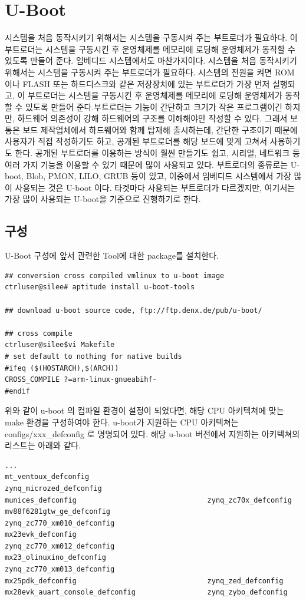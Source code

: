 \documentclass[11pt
  , a4paper
  , article
  , oneside
]{memoir}
\begin{document}
\chapter{U-Boot}
시스템을 처음 동작시키기 위해서는 시스템을 구동시켜 주는 부트로더가 필요하다. 이 부트로더는 시스템을 구동시킨 후 운영체제를 메모리에 로딩해 운영체제가 동작할 수 있도록 만들어 준다.  임베디드 시스템에서도 마찬가지이다. 시스템을 처음 동작시키기 위해서는 시스템을 구동시켜 주는 부트로더가 필요하다. 시스템의 전원을 켜면 ROM이나 FLASH 또는 하드디스크와 같은 저장장치에 있는 부트로더가 가장 먼저 실행되고, 이 부트로더는 시스템을 구동시킨 후 운영체제를 메모리에 로딩해 운영체제가 동작할 수 있도록 만들어 준다.부트로더는 기능이 간단하고 크기가 작은 프로그램이긴 하지만, 하드웨어 의존성이 강해 하드웨어의 구조를 이해해야만 작성할 수 있다. 그래서 보통은 보드 제작업체에서 하드웨어와 함께 탑재해 출시하는데, 간단한 구조이기 때문에 사용자가 직접 작성하기도 하고, 공개된 부트로더를 해당 보드에 맞게 고쳐서 사용하기도 한다. 공개된 부트로더를 이용하는 방식이 훨씬 만들기도 쉽고, 시리얼, 네트워크 등 여러 가지 기능을 이용할 수 있기 때문에 많이 사용되고 있다. 부트로더의 종류로는 U-boot, Blob, PMON, LILO, GRUB 등이 있고, 이중에서 임베디드 시스템에서 가장 많이 사용되는 것은 U-boot 이다. 타겟마다 사용되는 부트로더가 다르겠지만, 여기서는 가장 많이 사용되는 U-boot을 기준으로 진행하기로 한다.
\section{구성}
U-Boot 구성에 앞서 관련한 Tool에 대한 package를 설치한다.
\begin{lstlisting}[style=termstyle]
## conversion cross compiled vmlinux to u-boot image
ctrluser@silee# aptitude install u-boot-tools

## download u-boot source code, ftp://ftp.denx.de/pub/u-boot/

## cross compile 
ctrluser@silee$vi Makefile
# set default to nothing for native builds 
#ifeq ($(HOSTARCH),$(ARCH)) 
CROSS_COMPILE ?=arm-linux-gnueabihf- 
#endif
\end{lstlisting}
위와 같이 u-boot 의 컴파일 환경이 설정이 되었다면, 해당 CPU 아키텍쳐에 맞는 make 환경을 구성하여야 한다.
u-boot가 지원하는 CPU 아키텍쳐는 configs/xxx\_defconfig 로 명명되어 있다. 해당 u-boot 버전에서 지원하는 아키텍쳐의 리스트는 아래와 같다.

\begin{lstlisting}[style=termstyle]
...
mt_ventoux_defconfig                            zynq_microzed_defconfig
munices_defconfig                               zynq_zc70x_defconfig
mv88f6281gtw_ge_defconfig                       zynq_zc770_xm010_defconfig
mx23evk_defconfig                               zynq_zc770_xm012_defconfig
mx23_olinuxino_defconfig                        zynq_zc770_xm013_defconfig
mx25pdk_defconfig                               zynq_zed_defconfig
mx28evk_auart_console_defconfig                 zynq_zybo_defconfig
\end{lstlisting}
\end{document}

